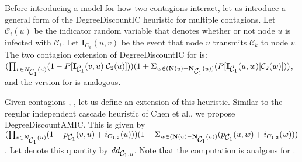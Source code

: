 \documentclass[11pt]{article}
\begin{document}
Before introducing a model for how two contagions interact, let us introduce a general form of the DegreeDiscountIC heuristic for multiple contagions. Let $\mathcal{C}_{i}(u)$ be the indicator random variable that denotes whether or not node $u$ is infected with $\mathcal{C}_{i}$. Let $\mathbf{I}_{C_{k}}(u,v)$ be the event that node $u$ transmits $\mathcal{C}_k$ to node $v$. The two contagion extension of DegreeDiscountIC for \cone{} is: $(\prod_{v\in \mathbf{}{N}_{\mbox{$\mathcal{C}_1$}{}}(u)}(1-P[\mathbf{I}_{\mbox{$\mathcal{C}_1$}}(v,u)|\mbox{$\mathcal{C}_2$}(u) ]))(1+\Sigma_{w \in  (\mathbf{N}(u)-  \mathbf{N}_{\mbox{$\mathcal{C}_1$}{}}(u))}(P[\mathbf{I}_{\mbox{$\mathcal{C}_1$}}(u,w)|\mbox{$\mathcal{C}_2$}(w)]))$, and the version for \ctwo{} is analogous.
    
Given contagions \cone{}, \ctwo{}, let us define an extension of this heuristic. Similar to the regular independent cascade heuristic of Chen et al., we propose DegreeDiscountAMIC.   This is given by $(\prod_{v\in \mathbf{}{N}_{\mbox{$\mathcal{C}_1$}{}}(u)}(1-p_{\mbox{$\mathcal{C}_1$}{}}(v,u) + i_{C_{1,2}}(u)))(1+\Sigma_{w \in  (\mathbf{N}(u)-  \mathbf{N}_{\mbox{$\mathcal{C}_1$}{}}(u))}(p_{\mbox{$\mathcal{C}_1$}{}}(u,w)+ i_{C_{1,2}}(w)))$. Let denote this quantity by $dd_{\mbox{$\mathcal{C}_1$}{}, u}$. Note that the computation is analgous for \ctwo{}.
\end{document}
